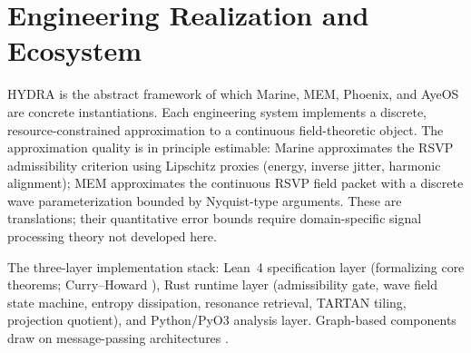 \documentclass[12pt, a4paper]{article}
\theoremstyle{rsvpstyle}
\theoremstyle{definition}
\begin{document}
\section{Engineering Realization and Ecosystem}

HYDRA is the abstract framework of which Marine, MEM, Phoenix, and
AyeOS are concrete instantiations. Each engineering system implements a
discrete, resource-constrained approximation to a continuous field-theoretic
object. The approximation quality is in principle estimable: Marine approximates
the RSVP admissibility criterion using Lipschitz proxies (energy, inverse jitter,
harmonic alignment); MEM approximates the continuous RSVP field packet
with a discrete wave parameterization bounded by Nyquist-type arguments. These
are translations; their quantitative error bounds require domain-specific
signal processing theory not developed here.

The three-layer implementation stack: Lean~4 specification layer (formalizing
core theorems; Curry--Howard \citep{CurryHoward}), Rust runtime layer
(admissibility gate, wave field state machine, entropy dissipation, resonance
retrieval, TARTAN tiling, projection quotient), and Python/PyO3 analysis layer.
Graph-based components draw on message-passing architectures \citep{ZhangEtAl2020}.

\begin{center}
\end{center}
\end{document}
